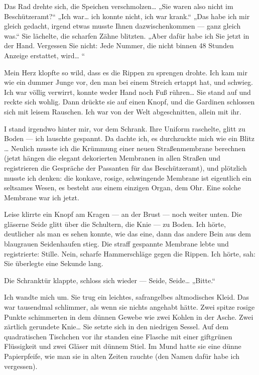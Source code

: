 Das Rad drehte sich, die Speichen verschmolzen\ldots{} „Sie waren also
nicht im Beschützeramt?“ „Ich war\ldots{} ich konnte nicht, ich war
krank.“ „Das habe ich mir gleich gedacht, irgend etwas musste Ihnen
dazwischenkommen — ganz gleich was.“ Sie lächelte, die scharfen
Zähne blitzten. „Aber dafür habe ich Sie jetzt in der Hand.
Vergessen Sie nicht: Jede Nummer, die nicht binnen 48 Stunden
Anzeige erstattet, wird\ldots{} “

Mein Herz klopfte so wild, dass es die Rippen zu sprengen drohte.
Ich kam mir wie ein dummer Junge vor, den man bei einem Streich
ertappt hat, und schwieg. Ich war völlig verwirrt, konnte weder
Hand noch Fuß rühren\ldots{} Sie stand auf und reckte sich wohlig. Dann
drückte sie auf einen Knopf, und die Gardinen schlossen sich mit
leisem Rauschen. Ich war von der Welt abgeschnitten, allein mit
ihr.

I stand irgendwo hinter mir, vor dem Schrank. Ihre Uniform
raschelte, glitt zu Boden — ich lauschte gespannt. Da dachte ich,
es durchzuckte mich wie ein Blitz \ldots{} Neulich musste ich die
Krümmung einer neuen Straßenmembrane berechnen (jetzt hängen die
elegant dekorierten Membranen in allen Straßen und registrieren die Gespräche der
Passanten für das Beschützeramt), und plötzlich musste ich denken:
die konkave, rosige, schwingende Membrane ist eigentlich ein
seltsames Wesen, es besteht aus einem einzigen Organ, dem Ohr. Eine
solche Membrane war ich jetzt.

Leise klirrte ein Knopf am Kragen — an der Brust — noch weiter
unten. Die gläserne Seide glitt über die Schultern, die Knie — zu
Boden. Ich hörte, deutlicher als man es sehen konnte, wie das eine,
dann das andere Bein aus dem blaugrauen Seidenhaufen stieg. Die
straff gespannte Membrane lebte und registrierte: Stille. Nein,
scharfe Hammerschläge gegen die Rippen. Ich hörte, sah: Sie
überlegte eine Sekunde lang.

Die Schranktür klappte, schloss sich wieder — Seide, Seide\ldots{}
„Bitte.“

Ich wandte mich um. Sie trug ein leichtes, safrangelbes
altmodisches Kleid. Das war tausendmal schlimmer, als wenn sie
nichts angehabt hätte. Zwei spitze rosige Punkte schimmerten in dem
dünnen Gewebe wie zwei Kohlen in der Asche. Zwei zärtlich gerundete
Knie\ldots{} Sie setzte sich in den niedrigen Sessel. Auf dem
quadratischen Tischchen vor ihr standen eine Flasche mit einer
giftgrünen Flüssigkeit und zwei Gläser mit dünnem Stiel. Im Mund
hatte sie eine dünne Papierpfeife, wie man sie in alten Zeiten
rauchte (den Namen dafür habe ich vergessen).

